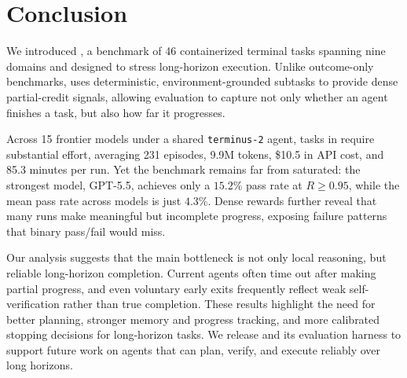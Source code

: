 \section{Conclusion}
\label{sec:conclusion}

We introduced \ours{}, a benchmark of 46 containerized terminal tasks spanning nine domains and designed to stress long-horizon execution.
Unlike outcome-only benchmarks, \ours{} uses deterministic, environment-grounded subtasks to provide dense partial-credit signals, allowing evaluation to capture not only whether an agent finishes a task, but also how far it progresses.

Across 15 frontier models under a shared \texttt{terminus-2} agent, tasks in \ours{} require substantial effort, averaging 231 episodes, 9.9M tokens, \$10.5 in API cost, and 85.3 minutes per run.
Yet the benchmark remains far from saturated: the strongest model, GPT-5.5, achieves only a $15.2\%$ pass rate at $R \geq 0.95$, while the mean pass rate across models is just $4.3\%$.
Dense rewards further reveal that many runs make meaningful but incomplete progress, exposing failure patterns that binary pass/fail would miss.

Our analysis suggests that the main bottleneck is not only local reasoning, but reliable long-horizon completion.
Current agents often time out after making partial progress, and even voluntary early exits frequently reflect weak self-verification rather than true completion.
These results highlight the need for better planning, stronger memory and progress tracking, and more calibrated stopping decisions for long-horizon tasks.
%
We release \ours{} and its evaluation harness to support future work on agents that can plan, verify, and execute reliably over long horizons.